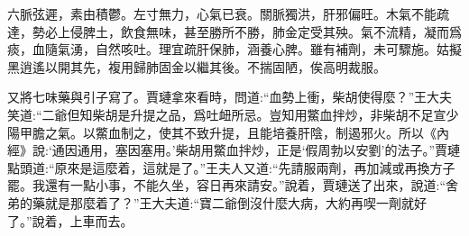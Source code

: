 \begin{qute2sp}
    六脈弦遲，素由積鬱。左寸無力，心氣已衰。關脈獨洪，肝邪偏旺。木氣不能疏達，勢必上侵脾土，飲食無味，甚至勝所不勝，肺金定受其殃。氣不流精，凝而爲痰，血隨氣湧，自然咳吐。理宜疏肝保肺，涵養心脾。雖有補劑，未可驟施。姑擬黑逍遙以開其先，複用歸肺固金以繼其後。不揣固陋，俟高明裁服。
\end{qute2sp}


\begin{parag}
    又將七味藥與引子寫了。賈璉拿來看時，問道:“血勢上衝，柴胡使得麼？”王大夫笑道:“二爺但知柴胡是升提之品，爲吐衄所忌。豈知用鱉血拌炒，非柴胡不足宣少陽甲膽之氣。以鱉血制之，使其不致升提，且能培養肝陰，制遏邪火。所以《內經》說:‘通因通用，塞因塞用。’柴胡用鱉血拌炒，正是‘假周勃以安劉’的法子。”賈璉點頭道:“原來是這麼着，這就是了。”王夫人又道:“先請服兩劑，再加減或再換方子罷。我還有一點小事，不能久坐，容日再來請安。”說着，賈璉送了出來，說道:“舍弟的藥就是那麼着了？”王大夫道:“寶二爺倒沒什麼大病，大約再喫一劑就好了。”說着，上車而去。
\end{parag}


